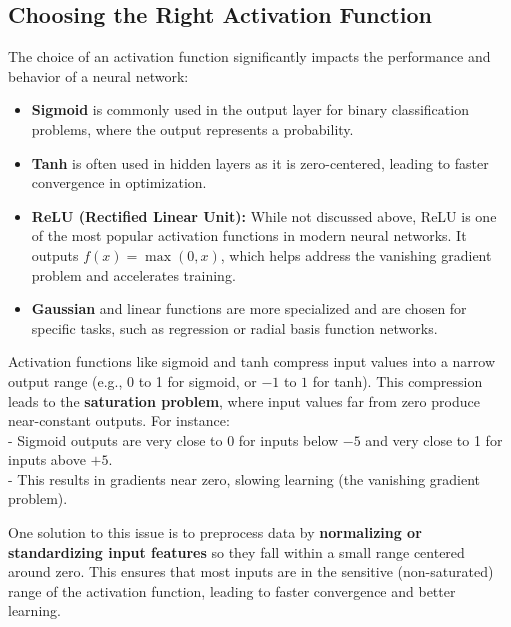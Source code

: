 \documentclass[
]{book}
\providecommand{\tightlist}{%
  \setlength{\itemsep}{0pt}\setlength{\parskip}{0pt}}
\theoremstyle{definition}
\theoremstyle{definition}
\theoremstyle{definition}
\theoremstyle{definition}
\theoremstyle{remark}
\begin{document}
\subsection*{Choosing the Right Activation Function}\label{choosing-the-right-activation-function}

The choice of an activation function significantly impacts the performance and behavior of a neural network:

\begin{itemize}
\tightlist
\item
  \textbf{Sigmoid} is commonly used in the output layer for binary classification problems, where the output represents a probability.\\
\item
  \textbf{Tanh} is often used in hidden layers as it is zero-centered, leading to faster convergence in optimization.\\
\item
  \textbf{ReLU (Rectified Linear Unit):} While not discussed above, ReLU is one of the most popular activation functions in modern neural networks. It outputs \(f(x) = \max(0, x)\), which helps address the vanishing gradient problem and accelerates training.\\
\item
  \textbf{Gaussian} and linear functions are more specialized and are chosen for specific tasks, such as regression or radial basis function networks.
\end{itemize}

Activation functions like sigmoid and tanh compress input values into a narrow output range (e.g., 0 to 1 for sigmoid, or \(-1\) to \(1\) for tanh). This compression leads to the \textbf{saturation problem}, where input values far from zero produce near-constant outputs. For instance:\\
- Sigmoid outputs are very close to 0 for inputs below \(-5\) and very close to 1 for inputs above \(+5\).\\
- This results in gradients near zero, slowing learning (the vanishing gradient problem).

One solution to this issue is to preprocess data by \textbf{normalizing or standardizing input features} so they fall within a small range centered around zero. This ensures that most inputs are in the sensitive (non-saturated) range of the activation function, leading to faster convergence and better learning.
\end{document}
